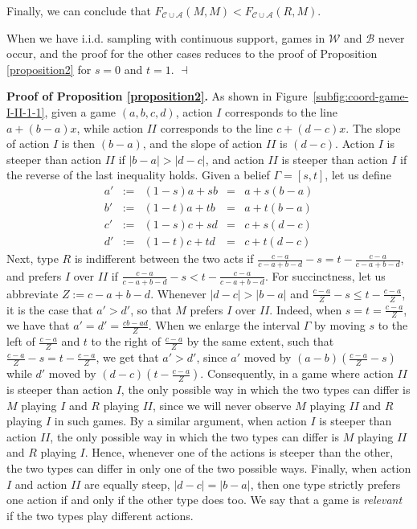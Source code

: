 \documentclass[fleqn,reqno,12pt]{article}
\theoremstyle{Satz}
\theoremstyle{Bsp}
\begin{document}
\noindent Finally, we can conclude that
$F_{\mathcal{C}\cup\mathcal{A}}(M,M)<F_{\mathcal{C}\cup\mathcal{A}}(R,M)$. 

When we have i.i.d. sampling with continuous support, games in $\mathcal{W}$ and
$\mathcal{B}$ never occur, and the proof for the other cases reduces to the proof of Proposition \ref{proposition2} for $s=0$ and $t=1$. \hfill $\dashv$


\vspace{.5cm}


\noindent \textbf{Proof of Proposition \ref{proposition2}.} 
As shown in Figure~\ref{subfig:coord-game-I-II-1-1}, given a game
$(a,b,c,d)$, action $I$ corresponds to the line $a+(b-a)x$, while
action $II$ corresponds to the line $c+(d-c)x$. The slope of action
$I$ is then $(b-a)$, and the slope of action $II$ is $(d-c)$.
Action $I$ is steeper than action $II$ if $|b-a|>|d-c|$, and action
$II$ is steeper than action $I$ if the reverse of the last inequality
holds. Given a belief $\Gamma=[s,t]$, let us define
\begin{equation}
\begin{array}{ccccc}
a' & := & (1-s)a+sb & = & a+s(b-a)\\
b' & := & (1-t)a+tb & = & a+t(b-a)\\
c' & := & (1-s)c+sd & = & c+s(d-c)\\
d' & := & (1-t)c+td & = & c+t(d-c)
\end{array}\label{eq:a'b'c'd'}
\end{equation}
Next, type $R$ is indifferent between the two acts if $\frac{c-a}{c-a+b-d}-s=t-\frac{c-a}{c-a+b-d}$,
and prefers $I$ over $II$ if $\frac{c-a}{c-a+b-d}-s<t-\frac{c-a}{c-a+b-d}$.
For succinctness, let us abbreviate $Z:=c-a+b-d$. Whenever $|d-c|>|b-a|$
and $\frac{c-a}{Z}-s\leq t-\frac{c-a}{Z}$, it is the case that $a'>d'$,
so that $M$ prefers $I$ over $II$. Indeed, when $s=t=\frac{c-a}{Z}$,
we have that $a'=d'=\frac{cb-ad}{Z}$. When we enlarge the interval
$\Gamma$ by moving $s$ to the left of $\frac{c-a}{Z}$ and $t$
to the right of $\frac{c-a}{Z}$ by the same extent, such that $\frac{c-a}{Z}-s=t-\frac{c-a}{Z}$,
we get that $a'>d'$, since $a'$ moved by $(a-b)(\frac{c-a}{Z}-s)$
while $d'$ moved by $(d-c)(t-\frac{c-a}{Z})$. Consequently, in a
game where action $II$ is steeper than action $I$, the only possible
way in which the two types can differ is $M$ playing $I$ and $R$
playing $II$, since we will never observe $M$ playing $II$ and
$R$ playing $I$ in such games. By a similar argument, when action
$I$ is steeper than action $II$, the only possible way in which
the two types can differ is $M$ playing $II$ and $R$ playing $I$.
Hence, whenever one of the actions is steeper than the other, the
two types can differ in only one of the two possible ways. Finally,
when action $I$ and action $II$ are equally steep, $|d-c|=|b-a|$,
then one type strictly prefers one action if and only if the other
type does too. We say that a game is \emph{relevant} if the two types
play different actions.
\end{document}
